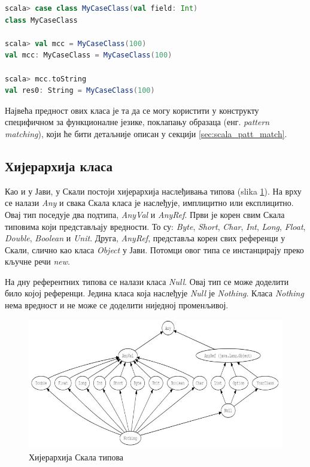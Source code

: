 \documentclass[12pt,oneside]{memoir}
\begin{document}
\begin{lstlisting}[language=Scala, caption={Пример коришћења \textit{case} класа}, label={lst:scala_oop_case_class_example}]
scala> case class MyCaseClass(val field: Int)
class MyCaseClass

scala> val mcc = MyCaseClass(100)
val mcc: MyCaseClass = MyCaseClass(100)

scala> mcc.toString
val res0: String = MyCaseClass(100)
\end{lstlisting}

Највећа предност ових класа је та да се могу користити у конструкту специфичном за функционалне језике, поклапању образаца (енг. \textit{pattern matching}), који ће бити детаљније описан у секцији \ref{sec:scala_patt_match}. \cite{scala_prog}

\subsection{Хијерархија класа}
\label{subsec:scala_class_hier}

Као и у Јави, у Скали постоји хијерархија наслеђивања типова (slika \ref{fig:scala_types_hier}). На врху се налази \textit{Any} и свака Скала класа је наслеђује, имплицитно или експлицитно. Овај тип поседује два подтипа, \textit{AnyVal} и \textit{AnyRef}. Први је корен свим Скала типовима који представљају вредности. То су: \textit{Byte}, \textit{Short}, \textit{Char}, \textit{Int}, \textit{Long}, \textit{Float}, \textit{Double}, \textit{Boolean} и \textit{Unit}. Друга, \textit{AnyRef}, представља корен свих референци у Скали, слично као класа \textit{Object} у Јави. Потомци овог типа се инстанцирају преко кључне речи \textit{new}. \cite{scala_prog}

На дну референтних типова се налази класа \textit{Null}. Овај тип се може доделити било којој референци. Једина класа која наслеђује \textit{Null} је \textit{Nothing}. Класа \textit{Nothing} нема вредност и не може се доделити ниједној променљивој.

\begin{figure}[!ht]
  \centering
  \includegraphics[width=1\textwidth]{pictures/scala-type-hierarchy.jpg}
  \caption{Хијерархија Скала типова}
  \label{fig:scala_types_hier}
\end{figure}
\end{document}
